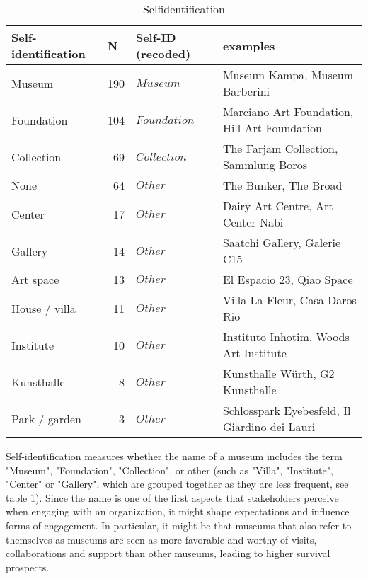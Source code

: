 \documentclass[12pt]{article}
\begin{document}
\begin{table}[ht]
\centering
\begin{tabular}{lrll}
  \hline 
 \multicolumn{1}{l}{Self-identification} & \multicolumn{1}{l}{N} & \multicolumn{1}{l}{Self-ID (recoded)} & \multicolumn{1}{l}{examples}\\ 
 \hline
 Museum & 190 & $Museum$ & Museum Kampa, Museum Barberini \\ 
  Foundation & 104 & $Foundation$ & Marciano Art Foundation, Hill Art Foundation \\ 
  Collection &  69 & $Collection$ & The Farjam Collection, Sammlung Boros \\ 
  None &  64 & $Other$ & The Bunker, The Broad \\ 
  Center &  17 & $Other$ & Dairy Art Centre, Art Center Nabi \\ 
  Gallery &  14 & $Other$ & Saatchi Gallery, Galerie C15 \\ 
  Art space &  13 & $Other$ & El Espacio 23, Qiao Space \\ 
  House / villa &  11 & $Other$ & Villa La Fleur, Casa Daros Rio \\ 
  Institute &  10 & $Other$ & Instituto Inhotim, Woods Art Institute \\ 
  Kunsthalle &   8 & $Other$ & Kunsthalle Würth, G2 Kunsthalle \\ 
  Park / garden &   3 & $Other$ & Schlosspark Eyebesfeld, Il Giardino dei Lauri \\ 
   \hline
\end{tabular}
\caption{Selfidentification} 
\label{tbl:t_selfid}
\end{table}

Self-identification measures whether the name of a museum includes the term "Museum", "Foundation", "Collection", or other (such as "Villa", "Institute", "Center" or "Gallery", which are grouped together as they are less frequent, see table \ref{tbl:t_selfid}).
Since the name is one of the first aspects that stakeholders perceive when engaging with an organization, it might shape expectations and influence forms of engagement.
In particular, it might be that museums that also refer to themselves as museums are seen as more favorable and worthy of visits, collaborations and support than other museums, leading to higher survival prospects.
\end{document}
